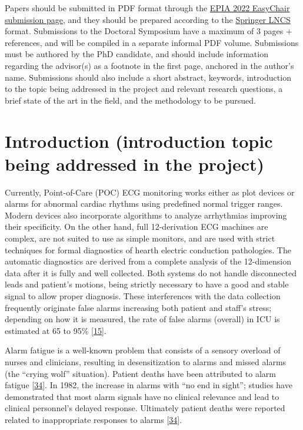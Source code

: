 \documentclass[runningheads]{llncs}
\begin{document}
Papers should be submitted in PDF format through the
\href{https://easychair.org/conferences/?conf=epia2022}{EPIA 2022 EasyChair submission page}, and they
should be prepared according to the
\href{http://www.springer.com/gp/computer-science/lncs/conference-proceedings-guidelines}{Springer LNCS}
format. Submissions to the Doctoral Symposium have a maximum of 3 pages + references, and will be
compiled in a separate informal PDF volume. Submissions must be authored by the PhD candidate, and
should include information regarding the advisor(s) as a footnote in the first page, anchored in the
author's name. Submissions should also include a short abstract, keywords, introduction to the
topic being addressed in the project and relevant research questions, a brief state of the art in
the field, and the methodology to be pursued.

\hypertarget{introduction-introduction-topic-being-addressed-in-the-project}{%
\section{Introduction (introduction topic being addressed in the project)}\label{introduction-introduction-topic-being-addressed-in-the-project}}

Currently, Point-of-Care (POC) ECG monitoring works either as plot devices or alarms for abnormal
cardiac rhythms using predefined normal trigger ranges. Modern devices also incorporate algorithms
to analyze arrhythmias improving their specificity. On the other hand, full 12-derivation ECG
machines are complex, are not suited to use as simple monitors, and are used with strict techniques
for formal diagnostics of hearth electric conduction pathologies. The automatic diagnostics are
derived from a complete analysis of the 12-dimension data after it is fully and well collected. Both
systems do not handle disconnected leads and patient's motions, being strictly necessary to have a
good and stable signal to allow proper diagnosis. These interferences with the data collection
frequently originate false alarms increasing both patient and staff's stress; depending on how it is
measured, the rate of false alarms (overall) in ICU is estimated at 65 to 95\% {[}\protect\hyperlink{ref-donchin2002}{15}{]}.

Alarm fatigue is a well-known problem that consists of a sensory overload of nurses and clinicians,
resulting in desensitization to alarms and missed alarms (the ``crying wolf'' situation). Patient
deaths have been attributed to alarm fatigue {[}\protect\hyperlink{ref-sendelbach2013}{34}{]}. In 1982, the increase in alarms with
``no end in sight''; studies have demonstrated that most alarm signals have no clinical relevance and
lead to clinical personnel's delayed response. Ultimately patient deaths were reported related to
inappropriate responses to alarms {[}\protect\hyperlink{ref-sendelbach2013}{34}{]}.
\end{document}
